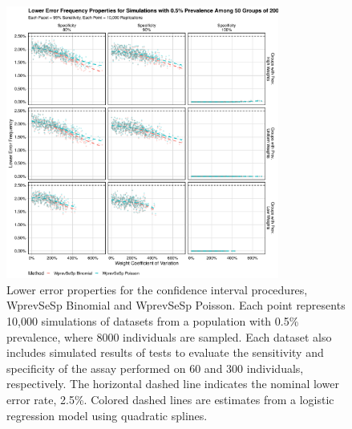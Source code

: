 \begin{figure}
\centering
\includegraphics[width=0.8\textwidth]{imperfect_lower_error_frequency_50_groups_0_005_prev}
\caption{Lower error properties for the confidence interval procedures, WprevSeSp Binomial and WprevSeSp Poisson.
Each point represents 10,000 simulations of datasets from a population with 0.5\% prevalence, where 8000 individuals are sampled.
Each dataset also includes simulated results of tests to evaluate the sensitivity and specificity of the assay performed on 60 and 300 individuals, respectively.
The horizontal dashed line indicates the nominal lower error rate, 2.5\%.
Colored dashed lines are estimates from a logistic regression model using quadratic splines.}
\label{ch_3:fig:imperfect_lower_error_frequency_50_groups_0_005_prev}
\end{figure}

